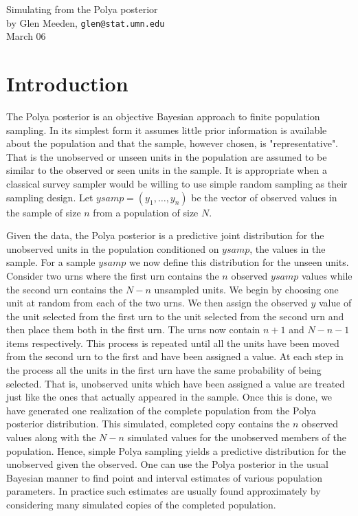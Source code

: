 \documentclass{article}
\begin{document}
\begin{center}
{\Large Simulating from the Polya posterior}\\
by Glen Meeden, \texttt{glen@stat.umn.edu}\\
 March 06
\end{center}
\section{Introduction}
\label{sec:intro}
The Polya posterior is an objective Bayesian approach to
finite population sampling. In its simplest form  it assumes
little prior information is available about the population
and that the sample, however chosen,
is "representative". That is the 
unobserved or unseen units in the population are assumed to be similar to
the observed or seen units in the sample. It is appropriate when a
classical survey sampler would be willing to use simple random
sampling as their sampling design. Let $ysamp=(y_1,\ldots,y_n)$ be the 
vector of observed values in the sample of size $n$ from a population of 
size $N$.

Given the data, the Polya posterior is a predictive joint
distribution for the unobserved  units in the population
conditioned on $ysamp$, the values in the sample. For a  sample $ysamp$
we now define this distribution for the unseen units. Consider
two urns where the first urn contains the $n$ 
observed $ysamp$ values while the second urn
contains the $N-n$ unsampled units. We begin by choosing one
unit at random from each of the two urns. We then assign the
observed $y$ value of the unit  selected from the first urn to the
unit selected from the second urn and then place them both in the
first urn. The urns now contain $n+1$ and $N-n-1$ items
respectively. This process is repeated until all the units have
been moved from the second urn to the first and have been assigned
a value. At each step in the process all the units in the first
urn have the same probability of being selected. That is, 
unobserved units which have been assigned a value are treated just like the
ones that actually  appeared in the sample. Once this is done,  we
have generated one realization of the complete population from the
Polya posterior distribution. This simulated, completed copy
contains the $n$ observed values along with the $N-n$
simulated values for the unobserved members of the population.
Hence, simple Polya sampling yields a predictive distribution for
the unobserved given the observed. One can use the Polya posterior
in the usual Bayesian manner to find point and interval estimates 
of various population parameters. In practice such estimates are 
usually found approximately by considering many simulated copies 
of the completed population. 
\end{document}
